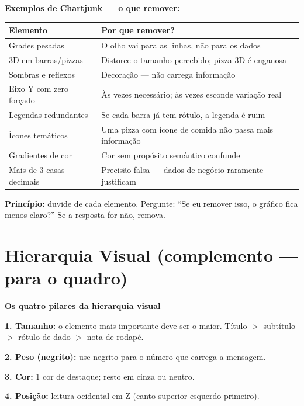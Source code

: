\begin{SolvedBox}
\textbf{Exemplos de Chartjunk — o que remover:}

\begin{tabular}{|l|p{8cm}|}
\hline
\textbf{Elemento} & \textbf{Por que remover?} \\
\hline
Grades pesadas & O olho vai para as linhas, não para os dados \\
3D em barras/pizzas & Distorce o tamanho percebido; pizza 3D é enganosa \\
Sombras e reflexos & Decoração — não carrega informação \\
Eixo Y com zero forçado & Às vezes necessário; às vezes esconde variação real \\
Legendas redundantes & Se cada barra já tem rótulo, a legenda é ruim \\
Ícones temáticos & Uma pizza com ícone de comida não passa mais informação \\
Gradientes de cor & Cor sem propósito semântico confunde \\
Mais de 3 casas decimais & Precisão falsa — dados de negócio raramente justificam \\
\hline
\end{tabular}

\textbf{Princípio:} duvide de cada elemento. Pergunte: ``Se eu remover isso,
o gráfico fica menos claro?'' Se a resposta for não, remova.
\end{SolvedBox}

\section{Hierarquia Visual (complemento — para o quadro)}

\begin{BoardBox}
\textbf{Os quatro pilares da hierarquia visual}

\textbf{1. Tamanho:} o elemento mais importante deve ser o maior.
Título $>$ subtítulo $>$ rótulo de dado $>$ nota de rodapé.

\textbf{2. Peso (negrito):} use negrito para o número que carrega a mensagem.

\textbf{3. Cor:} 1 cor de destaque; resto em cinza ou neutro.

\textbf{4. Posição:} leitura ocidental em Z (canto superior esquerdo primeiro).
\end{BoardBox}

